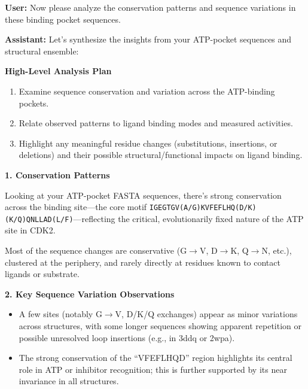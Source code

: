 \documentclass{article}
\begin{document}
\vspace{1.5em}

\begin{userbox}
\textbf{User:} Now please analyze the conservation patterns and sequence variations in these binding pocket sequences.
\end{userbox}

\begin{assistantbox}
\textbf{Assistant:} Let’s synthesize the insights from your ATP-pocket sequences and structural ensemble:

\textbf{High-Level Analysis Plan}
\begin{enumerate}[label=\arabic*.]
    \item Examine sequence conservation and variation across the ATP-binding pockets.
    \item Relate observed patterns to ligand binding modes and measured activities.
    \item Highlight any meaningful residue changes (substitutions, insertions, or deletions) and their possible structural/functional impacts on ligand binding.
\end{enumerate}

\textbf{1. Conservation Patterns}

Looking at your ATP-pocket FASTA sequences, there’s strong conservation across the binding site—the core motif \texttt{IGEGTGV(A/G)KVFEFLHQ(D/K)(K/Q)QNLLAD(L/F)}—reflecting the critical, evolutionarily fixed nature of the ATP site in CDK2.

Most of the sequence changes are conservative (G$\rightarrow$V, D$\rightarrow$K, Q$\rightarrow$N, etc.), clustered at the periphery, and rarely directly at residues known to contact ligands or substrate.

\textbf{2. Key Sequence Variation Observations}
\begin{itemize}
    \item A few sites (notably G$\rightarrow$V, D/K/Q exchanges) appear as minor variations across structures, with some longer sequences showing apparent repetition or possible unresolved loop insertions (e.g., in 3ddq or 2wpa).
    \item The strong conservation of the “VFEFLHQD” region highlights its central role in ATP or inhibitor recognition; this is further supported by its near invariance in all structures.
\end{itemize}


\end{assistantbox}
\end{document}
